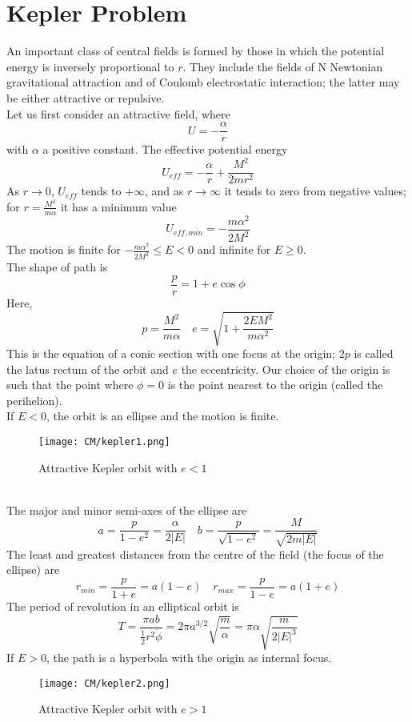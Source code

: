 \section{Kepler Problem}
An important class of central fields is formed by those in which the potential energy is inversely proportional to $r$. They include the fields of N Newtonian gravitational attraction and of Coulomb electrostatic interaction; the latter may be either attractive or repulsive.\\
Let us first consider an attractive field, where
\[U = -\frac{\alpha}{r}\]
with $\alpha$ a positive constant. The effective potential energy
\[U_{eff} = -\frac{\alpha}{r} + \frac{M^2}{2mr^2}\]
As $r \to 0$, $U_{eff}$ tends to $+\infty$, and as $r \to \infty$ it tends to zero from negative values; for $r = \frac{M^2}{m\alpha}$ it has a minimum value
\[U_{eff,min} = -\frac{m\alpha^2}{2M^2}\]
The motion is finite for $-\frac{m\alpha^2}{2M^2} \leq E < 0$ and infinite for $E \ge 0$.\\
The shape of path is
\[\frac{p}{r} = 1 + e \cos \phi\]
Here,
\[p = \frac{M^2}{m\alpha} \quad e = \sqrt{1 + \frac{2EM^2}{m \alpha^2}}\]
This is the equation of a conic section with one focus at the origin; $2p$ is called the latus rectum of the orbit and $e$ the eccentricity. Our choice of the origin is such that the point where $\phi = 0$ is the point nearest to the origin (called the perihelion). \\
If $E < 0$,  the orbit is an ellipse and the motion is finite.
\begin{figure}[!h]
	\centering
	\texttt{[image: CM/kepler1.png]}
	\caption{Attractive Kepler orbit with $e < 1$}
\end{figure}\\
The major and minor semi-axes of the ellipse are
\[a = \frac{p}{1-e^2} = \frac{\alpha}{2|E|} \quad b = \frac{p}{\sqrt{1-e^2}} = \frac{M}{\sqrt{2m|E|}}\]
The least and greatest distances from the centre of the field (the focus of the ellipse) are
\[r_{min} = \frac{p}{1+e} = a(1-e) \quad r_{max} = \frac{p}{1-e} = a(1+e)\]
The period of revolution in an elliptical orbit is
\[T = \frac{\pi a b}{\frac{1}{2}r^2 \dot{\phi}} = 2\pi a^{3/2}\sqrt{\frac{m}{\alpha}} = \pi \alpha \sqrt{\frac{m}{2|E|^3}}\]
If $E > 0$, the path is a hyperbola with the origin as internal focus. 
\begin{figure}[!h]
	\centering
	\texttt{[image: CM/kepler2.png]}
	\caption{Attractive Kepler orbit with $e > 1$}
\end{figure}\\
